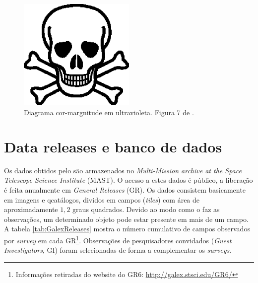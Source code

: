\begin{figure}
	\includegraphics[width=0.5\textwidth]{figuras/test.eps}
	\caption[Diagrama cor-margnitude em ultravioleta.]
	{Diagrama cor-margnitude em ultravioleta. Figura 7 de \citet{Wyder2007}.}
	\label{fig:WyderCMD}
\end{figure}




\section{Data releases e banco de dados}
\label{sec:Galex:BancoDeDados}

Os dados obtidos pelo \galex são armazenados no {\em Multi-Mission archive at
the Space Telescope Science Institute} (MAST). O acesso a estes dados é público,
a liberação é feita anualmente em {\em General Releases} (GR). Os dados
consistem basicamente em imagens e qcatálogos, dividos em campos ({\em tiles})
com área de aproximadamente $1,2$ graus quadrados. Devido ao modo como o \galex
faz as observações, um determinado objeto pode estar presente em mais de um
campo. A tabela \ref{tab:GalexReleases} mostra o número cumulativo de campos
observados por {\em survey} em cada GR\footnote{Informações retiradas do website
do GR6: \url{http://galex.stsci.edu/GR6/}}. Observações de pesquisadores
convidados ({\em Guest Investigators}, GI) foram selecionadas de forma a
complementar os {\em surveys}.

